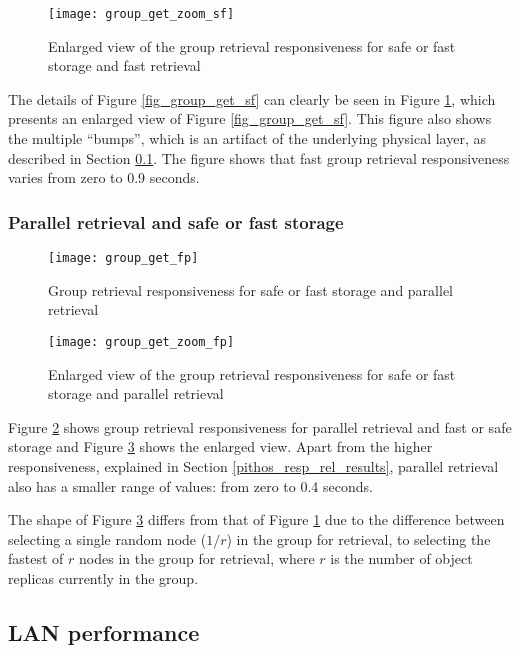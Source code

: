 \begin{figure}[htbp]
 \centering
 \texttt{[image: group\_get\_zoom\_sf]}
 \caption{Enlarged view of the group retrieval responsiveness for safe or fast storage and fast retrieval}
 \label{fig_group_get_zoom_sf}
\end{figure}
%
The details of Figure \ref{fig_group_get_sf} can clearly be seen in Figure \ref{fig_group_get_zoom_sf}, which presents an enlarged view of Figure \ref{fig_group_get_sf}. This figure also shows the multiple ``bumps'', which is an artifact of the underlying physical layer, as described in Section \ref{lan_retrieval}. The figure shows that fast group retrieval responsiveness varies from zero to 0.9 seconds.

\subsubsection{Parallel retrieval and safe or fast storage}
\begin{figure}[htbp]
 \centering
 \texttt{[image: group\_get\_fp]}
 \caption{Group retrieval responsiveness for safe or fast storage and parallel retrieval}
 \label{fig_group_get_fp}
\end{figure}

\begin{figure}[htbp]
 \centering
 \texttt{[image: group\_get\_zoom\_fp]}
 \caption{Enlarged view of the group retrieval responsiveness for safe or fast storage and parallel retrieval}
 \label{fig_group_get_zoom_fp}
\end{figure}
%
Figure \ref{fig_group_get_fp} shows group retrieval responsiveness for parallel retrieval and fast or safe storage and Figure \ref{fig_group_get_zoom_fp} shows the enlarged view. Apart from the higher responsiveness, explained in Section \ref{pithos_resp_rel_results}, parallel retrieval also has a smaller range of values: from zero to 0.4 seconds.

The shape of Figure \ref{fig_group_get_zoom_fp} differs from that of Figure \ref{fig_group_get_zoom_sf} due to the difference between selecting a single random node ($1/r$) in the group for retrieval, to selecting the fastest of $r$ nodes in the group for retrieval, where $r$ is the number of object replicas currently in the group.

\subsection{LAN performance}
\label{lan_retrieval}

